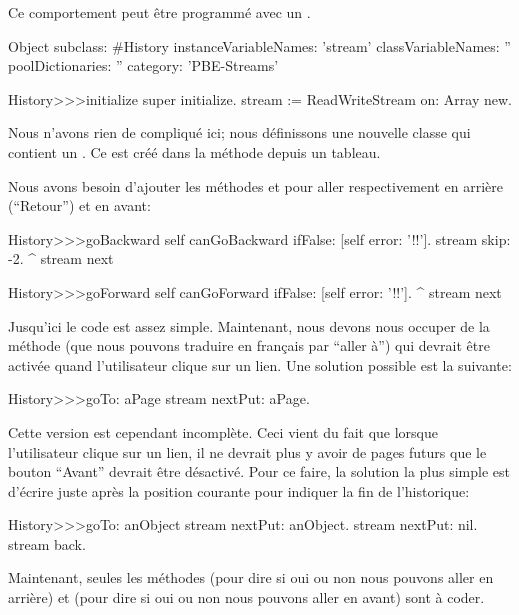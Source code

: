 \documentclass[a4paper,10pt,twoside]{book}
\begin{document}
Ce comportement peut être programmé avec un .

\begin{code}{}
Object subclass: #History
  instanceVariableNames: 'stream'
  classVariableNames: ''
  poolDictionaries: ''
  category: 'PBE-Streams'

History>>>initialize
    super initialize.
    stream := ReadWriteStream on: Array new.
\end{code}

Nous n'avons rien de compliqué ici; nous définissons une nouvelle classe
qui contient un \stream. Ce \stream est créé dans la méthode  
depuis un tableau.

Nous avons besoin d'ajouter les méthodes  et  pour aller respectivement en arrière (``Retour'') et en avant:

\begin{code}{}
History>>>goBackward
  self canGoBackward ifFalse: [self error: '!!'].
  stream skip: -2. 
  ^ stream next

History>>>goForward
  self canGoForward ifFalse: [self error: '!!'].
  ^ stream next
\end{code}

Jusqu'ici le code est assez simple. Maintenant, nous devons nous occuper
de la méthode  (que nous pouvons traduire en français par ``aller à'') qui devrait être activée quand l'utilisateur clique sur un lien. Une solution possible est la suivante:

\begin{code}{}
History>>>goTo: aPage
    stream nextPut: aPage.
\end{code}

Cette version est cependant incomplète. Ceci vient du fait que lorsque l'utilisateur clique sur un lien, il ne devrait plus y avoir de pages futurs \ie que le bouton ``Avant'' devrait être désactivé.
Pour ce faire, la solution la plus simple est d'écrire 
juste après la position courante pour indiquer la fin de l'historique:

\begin{code}{}
History>>>goTo: anObject
  stream nextPut: anObject.
  stream nextPut: nil.
  stream back.
\end{code}

Maintenant, seules les méthodes  (pour dire si oui ou non nous pouvons aller en arrière) et  (pour dire si oui ou non nous pouvons aller en avant) sont à coder.
\end{document}
